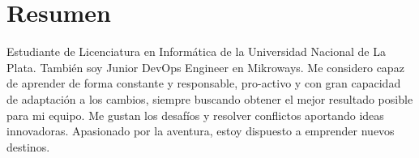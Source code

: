 \documentclass[espanol]{cv-style}     %
\begin{document}
\section{Resumen}
  \vspace{-0.3cm}
Estudiante de Licenciatura en Informática de la Universidad Nacional de La Plata.
También soy Junior DevOps Engineer en Mikroways.
Me considero capaz de aprender de forma constante y responsable, pro-activo y con gran capacidad de adaptación a los cambios, siempre buscando obtener el mejor resultado posible para mi equipo.
Me gustan los desafíos y resolver conflictos aportando ideas innovadoras.
Apasionado por la aventura, estoy dispuesto a emprender nuevos destinos.
\vspace{-0.2cm}
\end{document}
